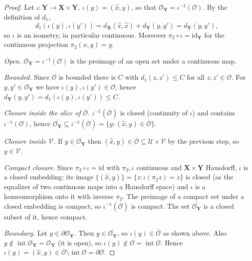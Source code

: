 \begin{proof}
Let $\iota:\mathbf Y\to\mathbf X\times\mathbf Y$, $\iota(y)=(\hat x,y)$, so that $\mathcal O_{\mathbf Y}=\iota^{-1}(\mathcal O)$. By the definition of $d_1$,
\[
d_1(\iota(y),\iota(y'))=d_{\mathbf X}(\hat x,\hat x)+d_{\mathbf Y}(y,y')=d_{\mathbf Y}(y,y'),
\]
so $\iota$ is an isometry, in particular continuous. Moreover $\pi_2\circ\iota=\mathrm{id}_{\mathbf Y}$ for the continuous projection $\pi_2(x,y)=y$.

\emph{Open.} $\mathcal O_{\mathbf Y}=\iota^{-1}(\mathcal O)$ is the preimage of an open set under a continuous map.

\emph{Bounded.} Since $\mathcal O$ is bounded there is $C$ with $d_1(z,z')\le C$ for all $z,z'\in\mathcal O$. For $y,y'\in\mathcal O_{\mathbf Y}$ we have $\iota(y),\iota(y')\in\mathcal O$, hence $d_{\mathbf Y}(y,y')=d_1(\iota(y),\iota(y'))\le C$.

\emph{Closure inside the slice of $\overline{\mathcal O}$.} $\iota^{-1}(\overline{\mathcal O})$ is closed (continuity of $\iota$) and contains $\iota^{-1}(\mathcal O)$, hence $\overline{\mathcal O_{\mathbf Y}}\subseteq\iota^{-1}(\overline{\mathcal O})=\{y:(\hat x,y)\in\overline{\mathcal O}\}$.

\emph{Closure inside $\mathcal V$.} If $y\in\overline{\mathcal O_{\mathbf Y}}$ then $(\hat x,y)\in\overline{\mathcal O}\subseteq\mathcal U\times\mathcal V$ by the previous step, so $y\in\mathcal V$.

\emph{Compact closure.} Since $\pi_2\circ\iota=\mathrm{id}$ with $\pi_2,\iota$ continuous and $\mathbf X\times\mathbf Y$ Hausdorff, $\iota$ is a closed embedding: its image $\{(\hat x,y)\}=\{z:\iota(\pi_2 z)=z\}$ is closed (as the equalizer of two continuous maps into a Hausdorff space) and $\iota$ is a homeomorphism onto it with inverse $\pi_2$. The preimage of a compact set under a closed embedding is compact, so $\iota^{-1}(\overline{\mathcal O})$ is compact. The set $\overline{\mathcal O_{\mathbf Y}}$ is a closed subset of it, hence compact.

\emph{Boundary.} Let $y\in\partial\mathcal O_{\mathbf Y}$. Then $y\in\overline{\mathcal O_{\mathbf Y}}$, so $\iota(y)\in\overline{\mathcal O}$ as shown above. Also $y\notin\operatorname{int}\mathcal O_{\mathbf Y}=\mathcal O_{\mathbf Y}$ (it is open), so $\iota(y)\notin\mathcal O=\operatorname{int}\mathcal O$. Hence $\iota(y)=(\hat x,y)\in\overline{\mathcal O}\setminus\operatorname{int}\mathcal O=\partial\mathcal O$.
\end{proof}
